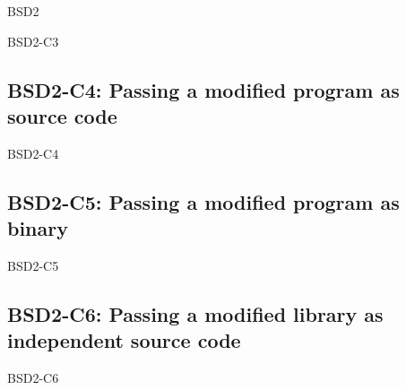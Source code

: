 \begin{license}{BSD2}
\begin{lsuc}{BSD2-C3}
  \lsucmeans{\useCaseThree}
  \lsuccovers{\coversThree}

  \begin{lsucrequires}  
    \lsucmandatory{\insertLicenseIntoBinary}\passingFilesCorrectly
  \end{lsucrequires}

  \lsucprohibitsnothing
\end{lsuc}

\subsection{BSD2-C4: Passing a modified program as source code}
\begin{lsuc}{BSD2-C4}

  \lsucmeans{\useCaseFour}
  \lsuccovers{\coversFour}

  \begin{lsucrequires}
    \lsucmandatory{\keepLicenseElements}
    \lsucoptional{\addLicenseToCopyrightMessage}
  \end{lsucrequires}

  \lsucprohibitsnothing
\end{lsuc}

\subsection{BSD2-C5: Passing a modified program as binary}
\begin{lsuc}{BSD2-C5}

  \lsucmeans{\useCaseFive}
  \lsuccovers{\coversFive}

  \begin{lsucrequires}
    \lsucmandatory{\insertLicenseIntoBinary}\passingFilesCorrectly
    \lsucoptional{\addLicenseToCopyrightMessage}
  \end{lsucrequires}

  \lsucprohibitsnothing
\end{lsuc}

\subsection{BSD2-C6: Passing a modified library as independent source code}
\begin{lsuc}{BSD2-C6}


\end{lsuc}
\end{license}
